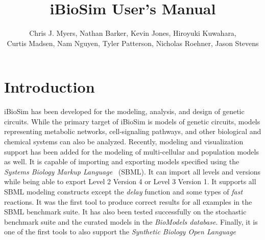 \documentclass[titlepage,11pt]{article}
\title{iBioSim User's Manual}
\author{Chris J. Myers, Nathan Barker, Kevin Jones, Hiroyuki Kuwahara,\\ Curtis
  Madsen, Nam Nguyen, Tyler Patterson, Nicholas Roehner, Jason Stevens}
\begin{document}
\maketitle

  
\tableofcontents

\clearpage
  

\section{Introduction}

\noindent
iBioSim has been developed for the modeling, analysis, and design of genetic circuits.  While the primary target of iBioSim is models of genetic circuits, models representing metabolic networks, cell-signaling pathways, and other biological and chemical systems can also be analyzed.  Recently, modeling and visualization support has been added for the modeling of multi-cellular and population models as well.
It is capable of importing and exporting models specified using the %
\emph{Systems Biology Markup Language}
~(SBML).  It can import all levels and versions while being able to export Level 2 Version 4 or Level 3 Version 1.  It supports all SBML modeling constructs except the \emph{delay} function and some types of \emph{fast} reactions.  It was the first tool to produce correct results for all examples in the SBML benchmark suite.  It has also been tested successfully on the stochastic benchmark suite and the curated models in the 
\emph{BioModels database}.
Finally, it is one of the first tools to also support the 
\emph{Synthetic Biology Open Language}
\end{document}
